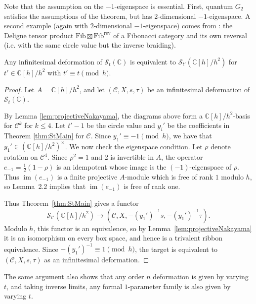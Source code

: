 \documentclass[12pt]{amsart}
\begin{document}
\begin{remark}
Note that the assumption on the $-1$-eigenspace is essential. First, quantum $G_2$ satisfies the assumptions of the theorem, but has $2$-dimensional $-1$-eigenspace. A second example (again with $2$-dimensional $-1$-eigenspace) comes from \cite{SpencerThesis}: the Deligne tensor product $\mathrm{Fib} \boxtimes \mathrm{Fib}^{\mathrm{rev}}$ of a Fibonacci category and its own reversal (i.e. with the same circle value but the inverse braiding).    
\end{remark}

\begin{corollary} \label{cor:StMain}
    Any infinitesimal deformation of $\mathcal{S}_t(\mathbb{C})$ is equivalent to $\mathcal{S}_{t'}(\mathbb{C}[h]/h^2)$ for $t' \in \mathbb{C}[h]/h^2$ with $t' \equiv t \pmod h$.
\end{corollary}
\begin{proof}
    Let $A=\mathbb{C}[h]/h^2$, and let $(\mathcal{C},X,s,\tau)$ be an infinitesimal deformation of $\mathcal{S}_t(\mathbb{C})$.

    By Lemma \ref{lem:projectiveNakayama}, the diagrams above form a $\mathbb{C}[h]/h^2$-basis for $\mathcal{C}^k$ for $k\leq 4$. Let $t'-1$ be the circle value and $y_i'$ be the coefficients in Theorem \ref{thm:StMain} for $\mathcal{C}$. Since $y_1' \equiv -1 \pmod{h}$, we have that $y_1' \in (\mathbb{C}[h]/h^2)^\times$. We now check the eigenspace condition. Let $\rho$ denote rotation on $\mathcal{C}^4$. Since $\rho^2=1$ and $2$ is invertible in $A$, the operator $e_{-1}=\frac{1}{2}(1-\rho)$ is an idempotent whose image is the $(-1)$-eigenspace of $\rho$. Thus $\operatorname{im}(e_{-1})$ is a finite projective $A$-module which is free of rank $1$ modulo $h$, so Lemma~2.2 implies that $\operatorname{im}(e_{-1})$ is free of rank one.
   
    Thus Theorem~\ref{thm:StMain} gives a functor
\[
\mathcal{S}_{t'}(\mathbb{C}[h]/h^2)
\longrightarrow
(\mathcal{C},X,-(y_1')^{-1}s,-(y_1')^{-1}\tau).
\]
Modulo $h$, this functor is an equivalence, so by Lemma~\ref{lem:projectiveNakayama} it is an isomorphism on every box space, and hence is a trivalent ribbon equivalence. Since $-(y_1')^{-1}\equiv 1\pmod h$, the target is equivalent to
$(\mathcal{C},X,s,\tau)$ as an infinitesimal deformation.
\end{proof}

\begin{remark}
    The same argument also shows that any order $n$ deformation is given by varying $t$, and taking inverse limits, any formal $1$-parameter family is also given by varying $t$.
\end{remark}




\end{document}
